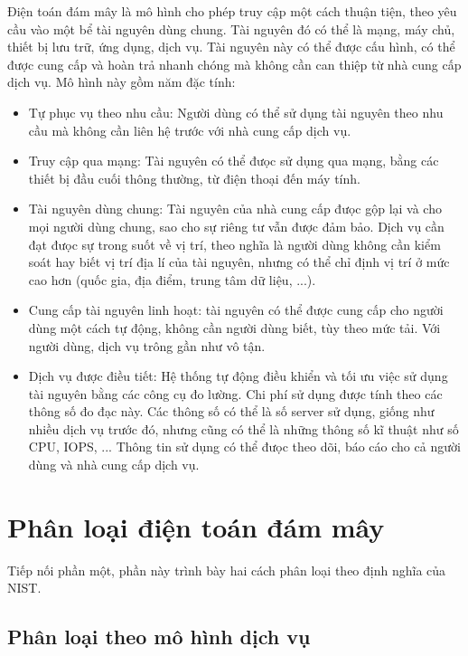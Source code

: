 \documentclass{article}
\begin{document}
Điện toán đám mây là mô hình cho phép truy cập một cách thuận tiện, theo yêu cầu
vào một bể tài nguyên dùng chung. Tài nguyên đó có thể là mạng, máy chủ, thiết
bị lưu trữ, ứng dụng, dịch vụ. Tài nguyên này có thể được cấu hình, có thể được
cung cấp và hoàn trả nhanh chóng mà không cần can thiệp từ nhà cung cấp dịch vụ.
Mô hình này gồm năm đặc tính:

\begin{itemize}
    \item Tự phục vụ theo nhu cầu: Người dùng có thể sử dụng tài nguyên theo nhu
    cầu mà không cần liên hệ trước với nhà cung cấp dịch vụ.
    \item Truy cập qua mạng: Tài nguyên có thể đưọc sử dụng qua mạng, bằng các
    thiết bị đầu cuối thông thường, từ điện thoại đến máy tính.
    \item Tài nguyên dùng chung: Tài nguyên của nhà cung cấp đưọc gộp lại và cho
    mọi người dùng chung, sao cho sự riêng tư vẫn được đảm bảo. Dịch vụ cần đạt
    đưọc sự trong suốt về vị trí, theo nghĩa là người dùng không cần kiểm soát
    hay biết vị trí địa lí của tài nguyên, nhưng có thể chỉ định vị trí ở mức
    cao hơn (quốc gia, địa điểm, trung tâm dữ liệu, ...).
    \item Cung cấp tài nguyên linh hoạt: tài nguyên có thể được cung cấp cho
    người dùng một cách tự động, không cần người dùng biết, tùy theo mức tải.
    Với người dùng, dịch vụ trông gần như vô tận.
    \item Dịch vụ được điều tiết: Hệ thống tự động điều khiển và tối ưu việc sử
    dụng tài nguyên bằng các công cụ đo lường. Chi phí sử dụng được tính theo
    các thông số đo đạc này. Các thông số có thể là số server sử dụng, giống như
    nhiều dịch vụ trước đó, nhưng cũng có thể là những thông số kĩ thuật như số
    CPU, IOPS, ... Thông tin sử dụng có thể đưọc theo dõi, báo cáo cho cả người
    dùng và nhà cung cấp dịch vụ.
\end{itemize}

\section{Phân loại điện toán đám mây}

Tiếp nối phần một, phần này trình bày hai cách phân loại theo định nghĩa của
NIST.

\subsection{Phân loại theo mô hình dịch vụ}
\end{document}
